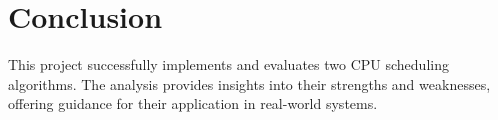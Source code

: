 \documentclass[12pt]{article}
\begin{document}
\section*{Conclusion}
This project successfully implements and evaluates two CPU scheduling algorithms. The analysis provides insights into their strengths and weaknesses, offering guidance for their application in real-world systems.
\end{document}
